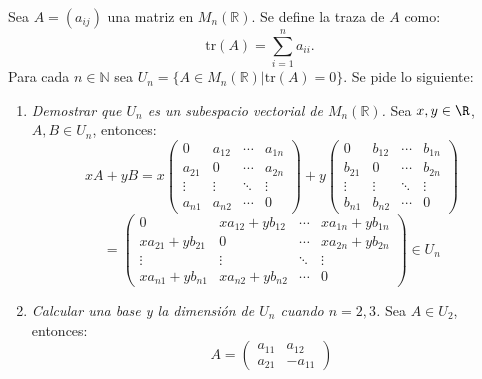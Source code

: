 \begin{ejercicio}
	Sea $A = (a_{ij})$ una matriz en $M_n(\mathbb{R})$. Se define la traza de $A$ como:
	\[
		\text{tr}(A) = \sum_{i=1}^n a_{ii}.
	\]
	Para cada $n \in \mathbb{N}$ sea $U_n = \{A \in M_n(\mathbb{R}) | \text{tr}(A) = 0\}$. Se pide lo siguiente:
	\begin{enumerate}
		\item \textit{Demostrar que $U_n$ es un subespacio vectorial de $M_n(\mathbb{R})$.}
		      Sea $x,y \in \R$, $A,B \in U_n$, entonces:
		      \begin{equation*}
			      xA + yB = x\begin{pmatrix}
				      0      & a_{12} & \cdots & a_{1n} \\
				      a_{21} & 0      & \cdots & a_{2n} \\
				      \vdots & \vdots & \ddots & \vdots \\
				      a_{n1} & a_{n2} & \cdots & 0
			      \end{pmatrix} + y\begin{pmatrix}
				      0      & b_{12} & \cdots & b_{1n} \\
				      b_{21} & 0      & \cdots & b_{2n} \\
				      \vdots & \vdots & \ddots & \vdots \\
				      b_{n1} & b_{n2} & \cdots & 0
			      \end{pmatrix}
		      \end{equation*}
		      \begin{equation*}
			      = \begin{pmatrix}
				      0                 & xa_{12} + yb_{12} & \cdots & xa_{1n} + yb_{1n} \\
				      xa_{21} + yb_{21} & 0                 & \cdots & xa_{2n} + yb_{2n} \\
				      \vdots            & \vdots            & \ddots & \vdots            \\
				      xa_{n1} + yb_{n1} & xa_{n2} + yb_{n2} & \cdots & 0
			      \end{pmatrix}
			      \in U_n
		      \end{equation*}
		\item \textit{Calcular una base y la dimensión de $U_n$ cuando $n = 2, 3$.}
		      Sea $A \in U_2$, entonces:
		      \begin{equation*}
			      A = \begin{pmatrix}
				      a_{11} & a_{12}  \\
				      a_{21} & -a_{11}

\end{pmatrix}
\end{equation*}
\end{enumerate}
\end{ejercicio}
